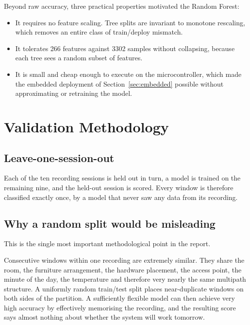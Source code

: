 \documentclass[11pt,a4paper]{article}
\begin{document}
\noindent
Beyond raw accuracy, three practical properties motivated the Random Forest:

\begin{itemize}[leftmargin=1.4em, itemsep=2pt]
  \item It requires no feature scaling. Tree splits are invariant to monotone
        rescaling, which removes an entire class of train/deploy mismatch.
  \item It tolerates 266 features against 3302 samples without collapsing,
        because each tree sees a random subset of features.
  \item It is small and cheap enough to execute on the microcontroller, which
        made the embedded deployment of Section~\ref{sec:embedded} possible
        without approximating or retraining the model.
\end{itemize}

\section{Validation Methodology}
\label{sec:validation}

\subsection{Leave-one-session-out}

Each of the ten recording sessions is held out in turn, a model is trained on
the remaining nine, and the held-out session is scored. Every window is
therefore classified exactly once, by a model that never saw any data from its
recording.

\subsection{Why a random split would be misleading}

This is the single most important methodological point in the report.

Consecutive windows within one recording are extremely similar. They share the
room, the furniture arrangement, the hardware placement, the access point, the
minute of the day, the temperature and therefore very nearly the same multipath
structure. A uniformly random train/test split places near-duplicate windows on
both sides of the partition. A sufficiently flexible model can then achieve
very high accuracy by effectively memorising the recording, and the resulting
score says almost nothing about whether the system will work tomorrow.
\end{document}
